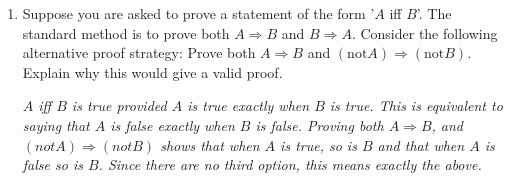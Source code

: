 \documentclass[11pt]{preprint}
\begin{document}
\begin{enumerate}
\begin{enumerate}
\begin{proof}
Let $a$ and $b$ be two odd integers. This means that there are integers $k_1,k_2$ such that $a=2k_1+1$ and $b=2k_2+1$, which implies
\[
a+b=2(k_1+k_2)+2=2(k_1+k_2+1).
\]
Since $k_1$ and $k_2$ are integers, so is $k_1+k_2+1$ and therefore $a+b$ is even.
\end{proof}
\item If $n$ is an odd integer, then $-n$ is also odd.
\begin{proof}
If $n$ is an odd integer, there is an integer $k$ such that $n=2k+1$. Then
\[
-n=-(2k+1)=-2k-1=-2k-2+1=2(-k-1)+1.
\]
Since $k$ is an integer, so is $-k-1$ and therefore $-n$ is odd.
\end{proof}
\item The product of an even integer and an odd integer is even.
\begin{proof}
Let $a$ be an even integer and $b$ be an odd integer. This means there are integers $k_1$ and $k_2$ such that $a=2k_1$ and $b=2k_2+1$. Thus
\[
ab=2k_1\cdot (2k_2+1)=2(2k_1k_2+k_1).
\]
Since $k_1$ and $k_2$ are integers, so is $2k_1k_2+k_1$ and this shows that $ab$ is even.
\end{proof}

\end{enumerate}




\item Suppose you are asked to prove a statement of the form '$A$ iff $B$'. The standard method is to prove both $A\Rightarrow B$ and $B\Rightarrow A$. Consider the following alternative proof strategy: Prove both $A\Rightarrow B$ and $(\textrm{not} A)\Rightarrow (\textrm{not} B)$. Explain why this would give a valid proof.

\vspace{0.1cm}
\textit{$A$ iff $B$ is true provided $A$ is true exactly when $B$ is true. This is equivalent to saying that $A$ is false exactly when $B$ is false. Proving both $A\Rightarrow B$, and $(not A)\Rightarrow(not B)$ shows that when $A$ is true, so is $B$ and that when $A$ is false so is $B$. Since there are no third option, this means exactly the above.}

\end{enumerate}
\end{document}
